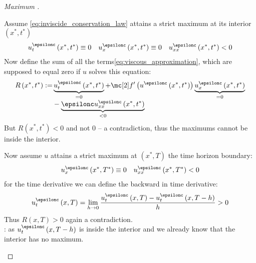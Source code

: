 \begin{proofbox}\nospacing
    \begin{proof}[Maximum ]\label{proof:princip:maximum_principle}\leavevmode
        \begin{circlelistnosep}
            \item Assume \cref{eq:inviscide_conservation_law} attains a strict maximum at its interior $\left(x^{*},t^{*}\right)$
            \begin{align*}
              u_{t}^{\epsilonc}\left(x^{*},t^{*}\right)\equiv0&&u_{x}^{\epsilonc}\left(x^{*},t^{*}\right)\equiv0
                                                            &&u_{xx}^{\epsilonc}\left(x^{*},t^{*}\right)<0
            \end{align*}
            Now define the sum of all the terms\cref{eq:viscous_approximation}, which are supposed to equal zero if $u$ solves this equation:
            \begin{align*}
              R\left(x^{*},t^{*}\right):=&\underbrace{u_{t}^{\epsilonc}\left(x^{*},t^{*}\right)}_{=0}+\flux'\left(u^{\epsilonc}\left(x^{*},t^{*}\right)\right)
                                           \underbrace{u_{x}^{\epsilonc}\left(x^{*},t^{*}\right)}_{=0}\\[-1\jot]
              &-\underbrace{\epsilonc u_{xx}^{\epsilonc}\left(x^{*},t^{*}\right)}_{<0}
            \end{align*}
            But $R\left(x^{*},t^{*}\right)<0$ and not $0$ -- a contradiction, thus the maximums cannot be inside the interior.
            \item Now assume $u$ attains a strict maximum at $\left(x^{*},T\right)$ the time horizon boundary:
            \begin{align*}
              u_{x}^{\epsilonc}\left(x^{*},T^{*}\right)\equiv0&&u_{xx}^{\epsilonc}\left(x^{*},T^{*}\right)<0
            \end{align*}
            for the time derivative we can define the backward in time derivative:
            \begin{align*}
              u_{t}^{\epsilonc}\left(x, T\right)=\lim_{h\to0}\frac{u_{t}^{\epsilonc}\left(x,T\right)-u_{t}^{\epsilonc}\left(x,T-h\right)}{h}>0
            \end{align*}
            Thus $R\left(x, T\right)>0$ again a contradiction.\\
            : as $u_{t}^{\epsilonc}\left(x,T-h\right)$ is inside the interior and we already know that the interior has no maximum.
            \begin{figure}[H]
                \centering{
                  \def\svgwidth{180pt}
                  \resizebox{0.6\linewidth}{!}{}
                }
            \end{figure}
        \end{circlelistnosep}
    \end{proof}
\end{proofbox}

